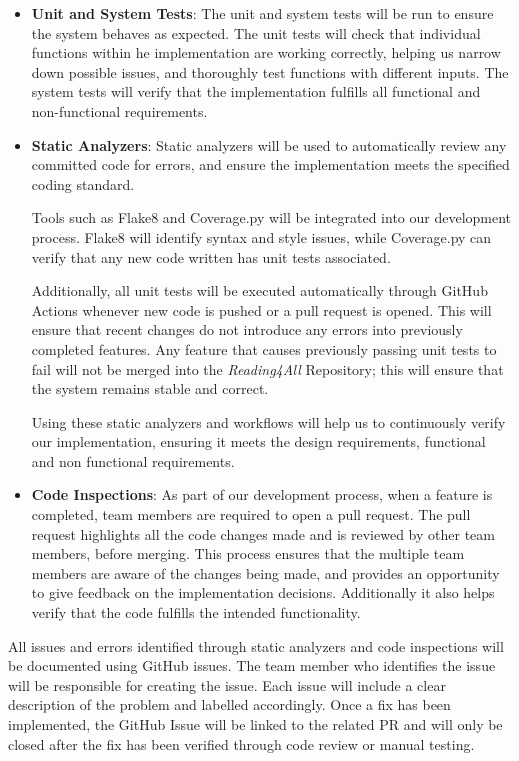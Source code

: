 \documentclass[12pt, titlepage]{article}
\begin{document}
\begin{itemize}
  \item \textbf{Unit and System Tests}:
  The unit and system tests will be run to ensure the system behaves as expected. The unit tests will check that individual functions within he implementation are working correctly, helping us narrow down possible issues, and thoroughly test functions with different inputs. 
  The system tests will verify that the implementation fulfills all functional and non-functional requirements. \\
  
  \item \textbf{Static Analyzers}:
  Static analyzers will be used to automatically review any committed
  code for errors, and ensure the implementation meets the specified
  coding standard.

  Tools such as Flake8 and Coverage.py will be integrated into our
  development process. Flake8 will identify syntax and style issues,
  while Coverage.py can verify that any new code written has unit tests
  associated.

  Additionally, all unit tests will be executed automatically through
  GitHub Actions whenever new code is pushed or a pull request is
  opened. This will ensure that recent changes do not introduce any
  errors into previously completed features. Any feature that causes previously passing unit tests to fail will not be merged into the \textit{Reading4All} Repository; 
  this will ensure that the system remains stable and correct.

  Using these static analyzers and workflows will help us to
  continuously verify our implementation, ensuring it meets the design
  requirements, functional and non functional requirements.
   
  \item \textbf{Code Inspections}:
  As part of our development process, when a feature is completed, team
  members are required to open a pull request. The pull request
  highlights all the code changes made and is reviewed by other team
  members, before merging.
  This process ensures that the multiple team members are aware of the
  changes being made, and provides an opportunity to give feedback on
  the implementation decisions. Additionally it also helps verify that
  the code fulfills the intended functionality.
\end{itemize}
All issues and errors identified through static analyzers and code inspections will be documented 
using GitHub issues. The team member who identifies the issue will be responsible for creating the issue. Each issue will include a clear description of the problem and labelled accordingly. 
Once a fix has been implemented, the GitHub Issue will be linked to the related PR and will only be closed after the fix has been verified through code review or manual testing. 
\end{document}
